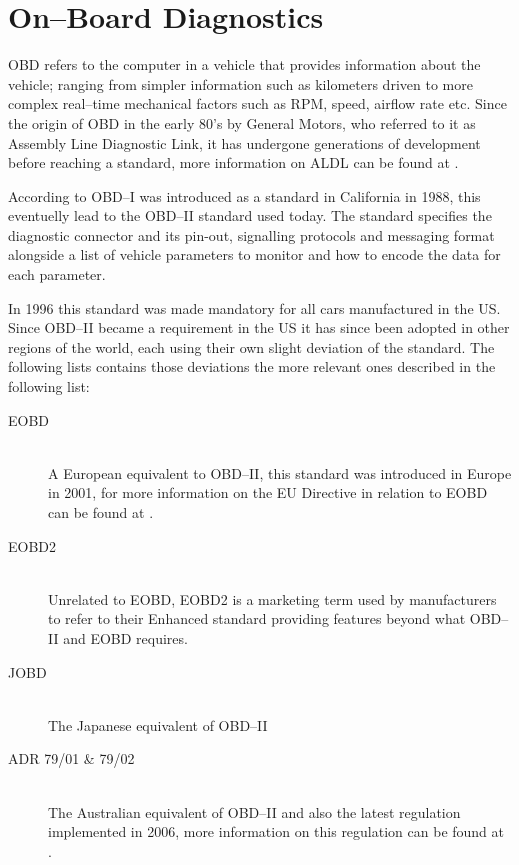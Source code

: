 \section{On--Board Diagnostics}\label{sec:on_board_diagnostics}
\ac{OBD} refers to the computer in a vehicle that provides information about the vehicle;
ranging from simpler information such as kilometers driven to more complex real--time mechanical factors such as RPM, speed, airflow rate etc.
Since the origin of \ac{OBD} in the early 80's by General Motors, who referred to it as Assembly Line Diagnostic Link, it has undergone generations of development before reaching a standard, more information on ALDL can be found at \cite{ALDL}.

According to \cite{CaliforniaEPA} OBD--I was introduced as a standard in California in 1988, this eventuelly lead to the OBD--II standard used today.
The standard specifies the diagnostic connector and its pin-out, signalling protocols and messaging format alongside a list of vehicle parameters to monitor and how to encode the data for each parameter.

In 1996 this standard was made mandatory for all cars manufactured in the US.
Since OBD--II became a requirement in the US it has since been adopted in other regions of the world, each using their own slight deviation of the standard.
The following lists contains those deviations the more relevant ones described in the following list:

\begin{description}
    \item[EOBD]\hfill\\
        A European equivalent to OBD--II, this standard was introduced in Europe in 2001, for more information on the EU Directive in relation to EOBD can be found at \cite{EUDirective}.
    \item[EOBD2]\hfill\\
        Unrelated to EOBD, EOBD2 is a marketing term used by manufacturers to refer to their Enhanced standard providing features beyond what OBD--II and EOBD requires.
    \item[JOBD]\hfill\\
        The Japanese equivalent of OBD--II
    \item[ADR 79/01 \& 79/02]\hfill\\
        The Australian equivalent of OBD--II and also the latest regulation implemented in 2006, more information on this regulation can be found at \cite{AustralianRegulation}.
\end{description}


